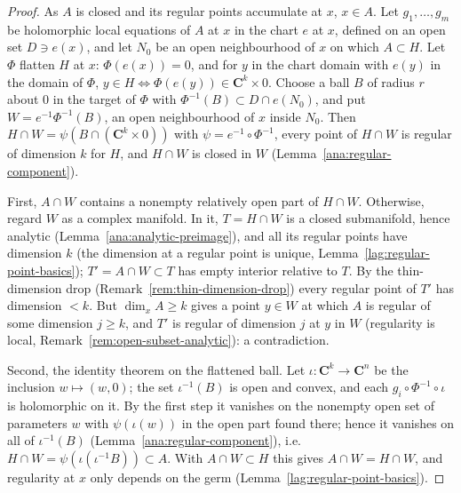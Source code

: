 \begin{proof}
\leanok
As \(A\) is closed and its regular points accumulate at \(x\), \(x\in A\). Let \(g_1,\dots,g_m\) be holomorphic local equations of \(A\) at \(x\) in the
chart \(e\) at \(x\), defined on an open set \(D\ni e(x)\), and let \(N_0\) be an open neighbourhood of \(x\) on which \(A\subset H\). Let \(\Phi\) flatten \(H\)
at \(x\): \(\Phi(e(x))=0\), and for \(y\) in the chart domain with \(e(y)\) in the domain of \(\Phi\), \(y\in H\iff\Phi(e(y))\in\mathbf C^k\times0\). Choose
a ball \(B\) of radius \(r\) about \(0\) in the target of \(\Phi\) with \(\Phi^{-1}(B)\subset D\cap e(N_0)\), and put \(W=e^{-1}\Phi^{-1}(B)\), an open
neighbourhood of \(x\) inside \(N_0\). Then \(H\cap W=\psi(B\cap(\mathbf C^k\times0))\) with \(\psi=e^{-1}\circ\Phi^{-1}\), every point of \(H\cap W\) is
regular of dimension \(k\) for \(H\), and \(H\cap W\) is closed in \(W\) (Lemma~\ref{ana:regular-component}).

First, \(A\cap W\) contains a nonempty relatively open part of \(H\cap W\). Otherwise, regard \(W\) as a complex manifold. In it, \(T=H\cap W\) is a
closed submanifold, hence analytic (Lemma~\ref{ana:analytic-preimage}), and all its regular points have dimension \(k\) (the dimension at a regular
point is unique, Lemma~\ref{lag:regular-point-basics}); \(T'=A\cap W\subset T\) has empty interior relative to \(T\). By the thin-dimension drop
(Remark~\ref{rem:thin-dimension-drop}) every regular point of \(T'\) has dimension \(<k\). But \(\dim_xA\ge k\) gives a point \(y\in W\) at which \(A\)
is regular of some dimension \(j\ge k\), and \(T'\) is regular of dimension \(j\) at \(y\) in \(W\) (regularity is local,
Remark~\ref{rem:open-subset-analytic}): a contradiction.

Second, the identity theorem on the flattened ball. Let \(\iota\colon\mathbf C^k\to\mathbf C^n\) be the inclusion \(w\mapsto(w,0)\); the set
\(\iota^{-1}(B)\) is open and convex, and each \(g_i\circ\Phi^{-1}\circ\iota\) is holomorphic on it. By the first step it vanishes on the nonempty open
set of parameters \(w\) with \(\psi(\iota(w))\) in the open part found there; hence it vanishes on all of \(\iota^{-1}(B)\)
(Lemma~\ref{ana:regular-component}), i.e.\ \(H\cap W=\psi(\iota(\iota^{-1}B))\subset A\). With \(A\cap W\subset H\) this gives \(A\cap W=H\cap W\), and
regularity at \(x\) only depends on the germ (Lemma~\ref{lag:regular-point-basics}).
\end{proof}

